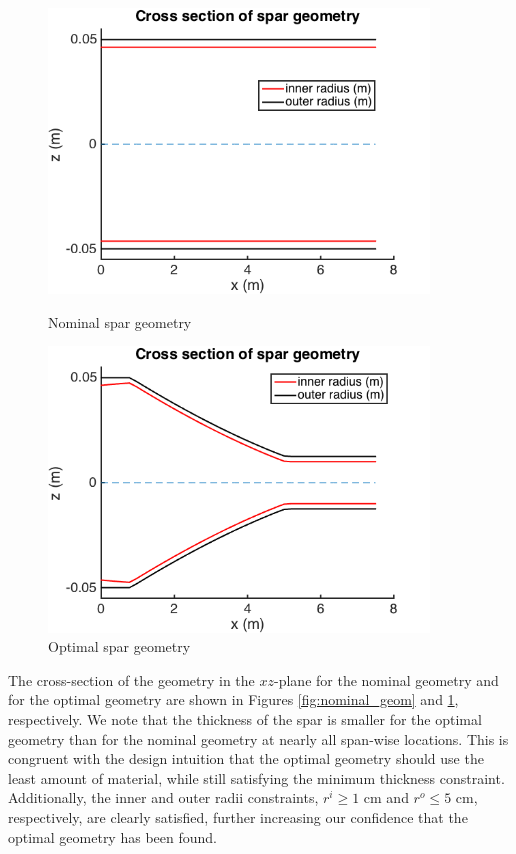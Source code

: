 \documentclass[11pt]{article}
\begin{document}
\begin{figure}[hbt]
\centering
\begin{minipage}[b]{0.4\textwidth}
\includegraphics[width=0.9\textwidth]{nominal_geom}
\caption{Nominal spar geometry}
\label{fig:nominal_geom}
\end{minipage}
\begin{minipage}[b]{0.4\textwidth}
\includegraphics[width=0.9\textwidth]{optimal_geom}
\caption{Optimal spar geometry}
\label{fig:optimal_geom}
\end{minipage}
\end{figure}

The cross-section of the geometry in the $xz$-plane
for the nominal geometry and for the optimal
geometry are shown in Figures \ref{fig:nominal_geom}
and \ref{fig:optimal_geom}, respectively.
We note that the thickness of the spar is smaller for
the optimal geometry than for the nominal geometry
at nearly all span-wise locations. This is congruent
with the design intuition that the optimal geometry
should use the least amount of material, while still
satisfying the minimum thickness constraint. Additionally,
the inner and outer radii constraints, $r^i \geq 1$ cm
and $r^o \leq 5$ cm, respectively, are clearly
satisfied, further increasing our confidence that
the optimal geometry has been found.
\end{document}
